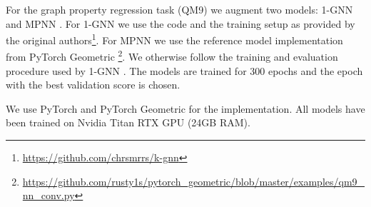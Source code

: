 \documentclass{article}
\begin{document}
\begin{table*}[ht]
\centering
{}
\caption{Real-world dataset statistics.}  
\label{tab:real_graphs}
\end{table*} 

For the graph property regression task (\textsc{QM9}) we augment two models: 1-GNN \citep{morris2019weisfeiler} and MPNN \citep{gilmer2017neural}. For 1-GNN we use the code and the training setup as provided by the original authors\footnote{\url{https://github.com/chrsmrrs/k-gnn}}. For MPNN we use the reference model implementation from PyTorch Geometric \footnote{\url{https://github.com/rusty1s/pytorch_geometric/blob/master/examples/qm9_nn_conv.py}}. We otherwise follow the training and evaluation procedure used by 1-GNN \citep{morris2019weisfeiler}. The models are trained for 300 epochs and the epoch with the best validation score is chosen. 

We use PyTorch \citep{paszke2019pytorch} and PyTorch Geometric \citep{fey2019fast} for the implementation. All models have been trained on Nvidia Titan RTX GPU (24GB RAM).
\end{document}
